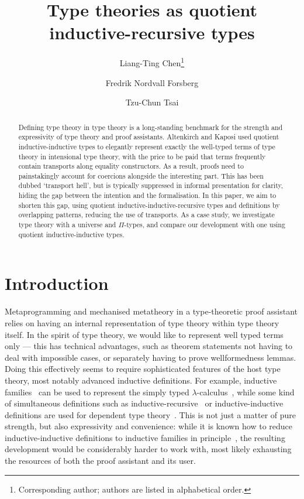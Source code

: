 \documentclass[a4paper,UKenglish,numberwithinsect,cleveref,thm-restate]{lipics-v2021}
\title{Type theories as quotient inductive-recursive types}
\author{Liang-Ting Chen\footnote{Corresponding author; authors are listed in alphabetical order.}}{Institute of Information Science, Academia Sinica, Taiwan \and \url{http://l-tchen.github.io}}{ltchen@iis.sinica.edu.tw}{https://orcid.org/0000-0002-3250-1331}{The National Science and Technology Council of Taiwan under grant NSTC 114-2222-E-001-001-MY3.}
\author{Fredrik Nordvall Forsberg}{Department of Computer and Information Sciences, University of Strathclyde, UK \and \url{https://fredriknf.com}}{fredrik.nordvall-forsberg@strath.ac.uk}{https://orcid.org/0000-0001-6157-9288}{The Engineering and Physical Sciences Research Council [EP/Y000455/1].}
\author{Tzu-Chun Tsai}{Institute of Information Science, Academia Sinica, Taiwan}{gene0905@icloud.com}{}{The National Science and Technology Council of Taiwan under grant NSTC 112-2221-E-001-003-MY3.}
\begin{document}
\maketitle

\begin{abstract}
  Defining type theory in type theory is a long-standing benchmark for the strength and expressivity of type theory and proof assistants.
  Altenkirch and Kaposi used quotient inductive-inductive types to elegantly represent exactly the well-typed terms of type theory in intensional type theory, with the price to be paid that terms frequently contain transports along equality constructors.
  As a result, proofs need to painstakingly account for coercions alongside the interesting part.
  This %
  has been dubbed `transport hell', but is typically suppressed in informal presentation for clarity, hiding the gap between the intention and the formalisation.
  In this paper, we aim to shorten this gap, using quotient inductive-inductive-recursive types and definitions by overlapping patterns, reducing the use of transports.
  As a case study, we investigate type theory with a universe and $\Pi$-types, and compare our development with one using quotient inductive-inductive types.
\end{abstract}

\section{Introduction} \label{sec:intro}

Metaprogramming and mechanised metatheory in a type-theoretic proof assistant relies on having an internal representation of type theory within type theory itself.
%
In the spirit of type theory, we would like to represent well typed terms only --- this has technical advantages, such as theorem statements not having to deal with impossible cases, or separately having to prove wellformedness lemmas.
%
Doing this effectively seems to require sophisticated features of the host type theory, most notably advanced inductive definitions.
%
For example, inductive families~\cite{Dybjer1994} can be used to represent the simply typed $\lambda$-calculus~\cite{Altenkirch1999}, while some kind of simultaneous definitions such as inductive-recursive~\cite{Dybjer2000} or inductive-inductive~\cite{Nordvall-Forsberg2014} definitions are used for dependent type theory~\cite{Danielsson2006,Chapman2009}.
%
This is not just a matter of pure strength, but also expressivity and convenience: while it is known how to reduce inductive-inductive definitions to inductive families in principle~\cite{Kaposi2020a}, the resulting development would be considerably harder to work with, most likely exhausting the resources of both the proof assistant and its user.
\end{document}
